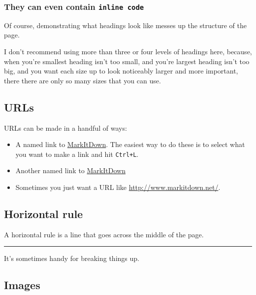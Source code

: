 \hypertarget{they-can-even-contain-inline-code}{%
\subsubsection{\texorpdfstring{They can even contain
\texttt{inline\ code}}{They can even contain inline code}}\label{they-can-even-contain-inline-code}}

Of course, demonstrating what headings look like messes up the structure
of the page.

I don't recommend using more than three or four levels of headings here,
because, when you're smallest heading isn't too small, and you're
largest heading isn't too big, and you want each size up to look
noticeably larger and more important, there there are only so many sizes
that you can use.

\hypertarget{urls}{%
\subsection{URLs}\label{urls}}

URLs can be made in a handful of ways:

\begin{itemize}
\tightlist
\item
  A named link to \href{http://www.markitdown.net/}{MarkItDown}. The
  easiest way to do these is to select what you want to make a link and
  hit \texttt{Ctrl+L}.
\item
  Another named link to \href{http://www.markitdown.net/}{MarkItDown}
\item
  Sometimes you just want a URL like \url{http://www.markitdown.net/}.
\end{itemize}

\hypertarget{horizontal-rule}{%
\subsection{Horizontal rule}\label{horizontal-rule}}

A horizontal rule is a line that goes across the middle of the page.

\begin{center}\rule{0.5\linewidth}{\linethickness}\end{center}

It's sometimes handy for breaking things up.

\hypertarget{images}{%
\subsection{Images}\label{images}}

